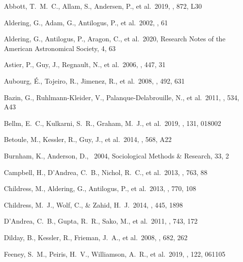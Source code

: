 \documentclass[]{aa}
\begin{document}

\begin{thebibliography}{} 

 Abbott, T.~M.~C., Allam, S.,
Andersen, P., et al.\ 2019, \apjl, 872, L30

 Aldering, G., Adam, G., Antilogus,
P., et al.\ 2002, \procspie, 61

 Aldering, G., Antilogus, P.,
Aragon, C., et al.\ 2020, Research Notes of the American Astronomical Society,
4, 63

 Astier, P., Guy, J., Regnault, N., et
al.\ 2006, \aap, 447, 31

 Aubourg, {\'E}., Tojeiro, R.,
Jimenez, R., et al.\ 2008, \aap, 492, 631 


 Bazin, G., Ruhlmann-Kleider, V.,
Palanque-Delabrouille, N., et al.\ 2011, \aap, 534, A43

 Bellm, E.~C., Kulkarni, S.~R., Graham,
M.~J., et al.\ 2019, \pasp, 131, 018002

 Betoule, M., Kessler, R., Guy, J.,
et al.\ 2014, \aap, 568, A22

 Burnham, K., Anderson, D., \
2004, Sociological Methods \& Research, 33, 2


 Campbell, H., D'Andrea, C.~B.,
Nichol, R.~C., et al.\ 2013, \apj, 763, 88

 Childress, M., Aldering, G.,
Antilogus, P., et al.\ 2013, \apj, 770, 108

 Childress, M.~J., Wolf, C., \&
Zahid, H.~J.\ 2014, \mnras, 445, 1898


 D'Andrea, C.~B., Gupta, R.~R.,
Sako, M., et al.\ 2011, \apj, 743, 172

 Dilday, B., Kessler, R., Frieman,
J.~A., et al.\ 2008, \apj, 682, 262


 Feeney, S.~M., Peiris, H.~V.,
Williamson, A.~R., et al.\ 2019, \prl, 122, 061105


\end{thebibliography}
\end{document}

